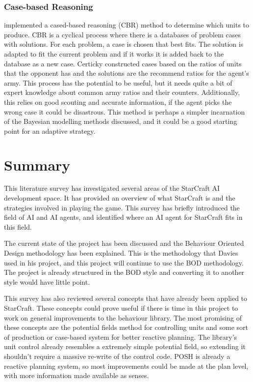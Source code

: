 \documentclass[11pt,openright,a4paper]{report}
\begin{document}
\subsubsection{Case-based Reasoning}
 implemented a cased-based reasoning (CBR) method to determine which units to produce. CBR is a cyclical process where there is a databases of problem cases with solutions. For each problem, a case is chosen that best fits. The solution is adapted to fit the current problem and if it works it is added back to the database as a new case. Certicky constructed cases based on the ratios of units that the opponent has and the solutions are the recommend ratios for the agent's army. This process has the potential to be useful, but it needs quite a bit of expert knowledge about common army ratios and their counters. Additionally, this relies on good scouting and accurate information, if the agent picks the wrong case it could be disastrous. This method is perhaps a simpler incarnation of the Bayesian modelling methods discussed, and it could be a good starting point for an adaptive strategy.

\section{Summary}
This literature survey has investigated several areas of the StarCraft AI development space. It has provided an overview of what StarCraft is and the strategies involved in playing the game. This survey has briefly introduced the field of AI and AI agents, and identified where an AI agent for StarCraft fits in this field.

The current state of the project has been discussed and the Behaviour Oriented Design methodology has been explained. This is the methodology that Davies used in his project, and this project will continue to use the BOD methodology. The project is already structured in the BOD style and converting it to another style would have little point.

This survey has also reviewed several concepts that have already been applied to StarCraft. These concepts could prove useful if there is time in this project to work on general improvements to the behaviour library. The most promising of these concepts are the potential fields method for controlling units and some sort of production or case-based system for better reactive planning. The library's unit control already resembles a extremely simple potential field, so extending it shouldn't require a massive re-write of the control code. POSH is already a reactive planning system, so most improvements could be made at the plan level, with more information made available as senses.
\end{document}
